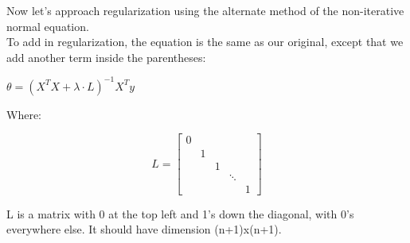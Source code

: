 Now let's approach regularization using the alternate method of the non-iterative normal equation.\\

To add in regularization, the equation is the same as our original, except that we add another term inside the parentheses:\\

\begin{center}
$\theta = (X^TX+\lambda\cdot L)^{-1} X^Ty$
\end{center}

Where:

\[
L =
\begin{bmatrix}
0 & && &\\
& 1& & &\\
& & 1&&\\
&&&\ddots&\\
&&&&1
\end{bmatrix}
\]

L is a matrix with 0 at the top left and 1's down the diagonal, with 0's everywhere else. It should have dimension (n+1)x(n+1).